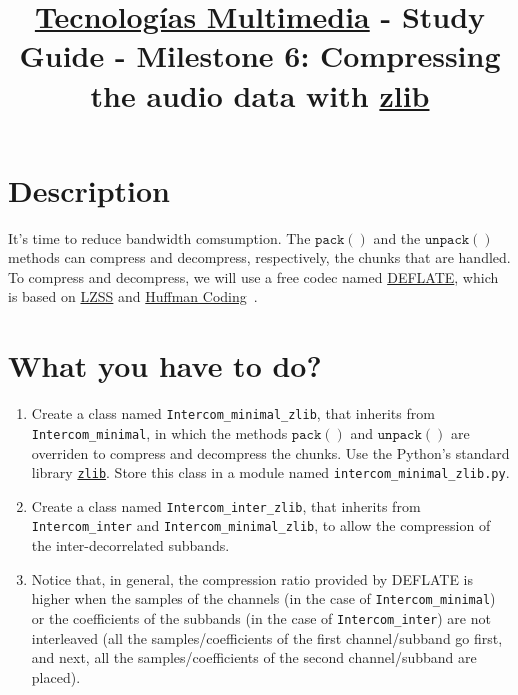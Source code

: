 \title{\href{https://www.ual.es/estudios/grados/presentacion/plandeestudios/asignatura/4015/40154321?idioma=zh_CN}{Tecnologías Multimedia} - Study Guide - Milestone 6: Compressing the audio data with \href{https://zlib.net/}{zlib}}

\maketitle

\section{Description}

It's time to reduce bandwidth comsumption. The $\mathtt{pack()}$ and
the $\mathtt{unpack()}$ methods can compress and decompress,
respectively, the chunks that are handled. To compress and decompress,
we will use a free codec named
\href{https://en.wikipedia.org/wiki/DEFLATE}{DEFLATE}, which is based
on \href{https://en.wikipedia.org/wiki/Lempel%E2%80%93Ziv%E2%80%93Storer%E2%80%93Szymanski}{LZSS}
and \href{https://en.wikipedia.org/wiki/Huffman_coding}{Huffman Coding}~\cite{nelson96datacompression}.

\section{What you have to do?}

\begin{enumerate}
\item Create a class named \texttt{Intercom\_minimal\_zlib}, that
  inherits from \texttt{Intercom\_minimal}, in which the methods
  $\mathtt{pack()}$ and $\mathtt{unpack()}$ are overriden to compress
  and decompress the chunks. Use the Python's standard library
  \href{https://docs.python.org/3/library/zlib.html}{\texttt{zlib}}. Store
  this class in a module named \texttt{intercom\_minimal\_zlib.py}.
\item Create a class named \texttt{Intercom\_inter\_zlib}, that
  inherits from \texttt{Intercom\_inter} and
  \texttt{Intercom\_minimal\_zlib}, to allow the compression of the
  inter-decorrelated subbands.
\item Notice that, in general, the compression ratio provided by
  DEFLATE is higher when the samples of the channels (in the case of
  \texttt{Intercom\_minimal}) or the coefficients of the subbands (in
  the case of \texttt{Intercom\_inter}) are not interleaved (all the
  samples/coefficients of the first channel/subband go first, and
  next, all the samples/coefficients of the second channel/subband are
  placed).
\end{enumerate}

